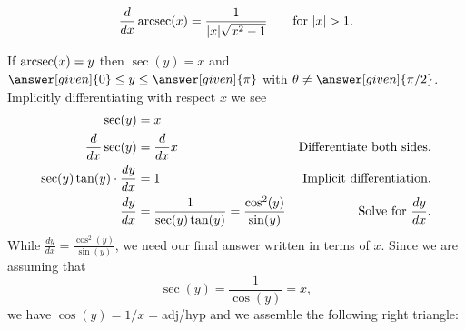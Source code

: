 \documentclass{ximera}
\begin{document}
\begin{theorem}
\[
\ddx \arcsec(x) = \frac{1}{|x|\sqrt{x^2-1}}\qquad\text{for $|x|>1$.}
\]
\begin{explanation} 
  If
\(
\operatorname{arcsec}(x) = y
\)
then $\sec(y) = x$ and $\answer[given]{0}\le y\le
\answer[given]{\pi}$ with $\theta\ne \answer[given]{\pi/2}$.  Implicitly
differentiating with respect $x$ we see
\begin{align*}
\sec(y) &= x\\
\frac{d}{\mathop{}\!d x} \sec(y) &= \frac{d}{\mathop{}\!d x} x                     &\text{Differentiate both sides.}\\
\sec(y)\tan(y) \cdot \frac{dy}{dx} &= 1     &\text{Implicit differentiation.}\\
\frac{dy}{dx} &= \frac{1}{\sec(y)\tan(y)}=\frac{\cos^2(y)}{\sin(y)} &\text{Solve for $\frac{dy}{dx}$}.
\end{align*}
While $\frac{dy}{dx} = \frac{\cos^2(y)}{\sin(y)}$, we need our final
answer written in terms of $x$. Since we are assuming that
\[
\sec(y) = \frac{1}{\cos(y)}= x,
\]
we have $\cos(y)=1/x=$adj/hyp and we assemble the following right triangle:
    \begin{image}[2in]
    \end{image}
    

\end{explanation}
\end{theorem}
\end{document}
